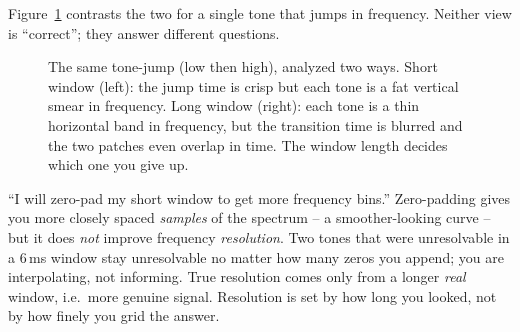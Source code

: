 Figure~\ref{ch10:fig-tradeoff} contrasts the two for a single tone that jumps in
frequency. Neither view is ``correct''; they answer different questions.

\begin{figure}[H]
\centering
{}
\caption{The same tone-jump (low then high), analyzed two ways. Short window
(left): the jump time is crisp but each tone is a fat vertical smear in frequency.
Long window (right): each tone is a thin horizontal band in frequency, but the
transition time is blurred and the two patches even overlap in time. The
window length decides which one you give up.}
\label{ch10:fig-tradeoff}
\end{figure}

\begin{trapbox}
``I will zero-pad my short window to get more frequency bins.'' Zero-padding
gives you more closely spaced \emph{samples} of the spectrum -- a smoother-looking
curve -- but it does \emph{not} improve frequency \emph{resolution}. Two tones
that were unresolvable in a 6\,ms window stay unresolvable no matter how many
zeros you append; you are interpolating, not informing. True resolution comes only
from a longer \emph{real} window, i.e.\ more genuine signal. Resolution is set by
how long you looked, not by how finely you grid the answer.
\end{trapbox}

